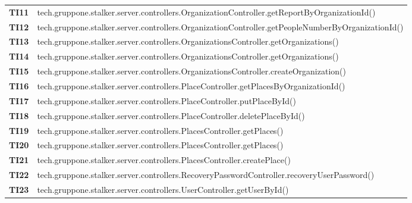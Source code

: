 \documentclass[../../piano-di-qualifica.tex]{subfiles}
\begin{document}
\begin{longtable}[H]{>{\centering\bfseries}m{3cm} >{}m{13cm}}
  TI11               & tech.gruppone.stalker.server.controllers.OrganizationController.getReportByOrganizationId\@()             \\

  TI12               & tech.gruppone.stalker.server.controllers.OrganizationController.getPeopleNumberByOrganizationId\@()       \\

  TI13               & tech.gruppone.stalker.server.controllers.OrganizationsController.getOrganizations\@()                     \\

  TI14               & tech.gruppone.stalker.server.controllers.OrganizationsController.getOrganizations\@()                     \\

  TI15               & tech.gruppone.stalker.server.controllers.OrganizationsController.createOrganization\@()                   \\

  TI16               & tech.gruppone.stalker.server.controllers.PlaceController.getPlacesByOrganizationId\@()                    \\

  TI17               & tech.gruppone.stalker.server.controllers.PlaceController.putPlaceById\@()                                 \\

  TI18               & tech.gruppone.stalker.server.controllers.PlaceController.deletePlaceById\@()                              \\

  TI19               & tech.gruppone.stalker.server.controllers.PlacesController.getPlaces\@()                                   \\

  TI20               & tech.gruppone.stalker.server.controllers.PlacesController.getPlaces\@()                                   \\

  TI21               & tech.gruppone.stalker.server.controllers.PlacesController.createPlace\@()                                 \\

  TI22               & tech.gruppone.stalker.server.controllers.RecoveryPasswordController.recoveryUserPassword\@()              \\

  TI23               & tech.gruppone.stalker.server.controllers.UserController.getUserById\@()                                   \\


\end{longtable}
\end{document}
